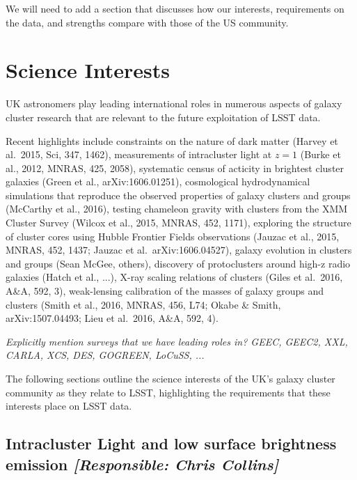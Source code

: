 \documentclass[a4paper,11pt]{article}
\begin{document}
We will need to add a section that discusses how our interests,
requirements on the data, and strengths compare with those of the US
community.

\section{Science Interests}

UK astronomers play leading international roles in numerous aspects of
galaxy cluster research that are relevant to the future exploitation
of LSST data.  

Recent highlights include constraints on the nature of dark matter
(Harvey et al.\ 2015, Sci, 347, 1462), measurements of intracluster
light at $z=1$ (Burke et al., 2012, MNRAS, 425, 2058), systematic
census of acticity in brightest cluster galaxies (Green et al.,
arXiv:1606.01251), cosmological hydrodynamical simulations that
reproduce the observed properties of galaxy clusters and groups
(McCarthy et al., 2016), testing chameleon gravity with clusters from
the XMM Cluster Survey (Wilcox et al., 2015, MNRAS, 452, 1171),
exploring the structure of cluster cores using Hubble Frontier Fields
observations (Jauzac et al., 2015, MNRAS, 452, 1437; Jauzac et
al.\ arXiv:1606.04527), galaxy evolution in clusters and groups (Sean
McGee, others), discovery of protoclusters around high-z radio
galaxies (Hatch et al., ...), X-ray scaling relations of clusters
(Giles et al.\ 2016, A\&A, 592, 3), weak-lensing calibration of the
masses of galaxy groups and clusters (Smith et al., 2016, MNRAS, 456,
L74; Okabe \& Smith, arXiv:1507.04493; Lieu et al.\ 2016, A\&A, 592,
4).

\emph{Explicitly mention surveys that we have leading roles in?  GEEC,
  GEEC2, XXL, CARLA, XCS, DES, GOGREEN, LoCuSS, ...}

The following sections outline the science interests of the UK's
galaxy cluster community as they relate to LSST, highlighting the
requirements that these interests place on LSST data.

\subsection{Intracluster Light and low surface brightness emission {\it [Responsible: Chris Collins]}}
\end{document}
